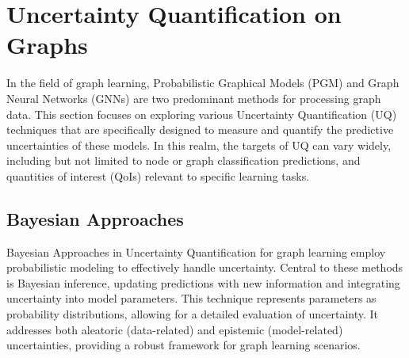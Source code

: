 \section{Uncertainty Quantification on Graphs}
In the field of graph learning, Probabilistic Graphical Models (PGM) and Graph Neural Networks (GNNs) are two predominant methods for processing graph data. 
This section focuses on exploring various Uncertainty Quantification (UQ) techniques that are specifically designed to measure and quantify the predictive uncertainties of these models. 
In this realm, the targets of UQ can vary widely, including but not limited to node or graph classification predictions, and quantities of interest (QoIs) relevant to specific learning tasks. 

\subsection{Bayesian Approaches}

Bayesian Approaches in Uncertainty Quantification for graph learning employ probabilistic modeling to effectively handle uncertainty. Central to these methods is Bayesian inference, updating predictions with new information and integrating uncertainty into model parameters. This technique represents parameters as probability distributions, allowing for a detailed evaluation of uncertainty. It addresses both aleatoric (data-related) and epistemic (model-related) uncertainties, providing a robust framework for graph learning scenarios.





